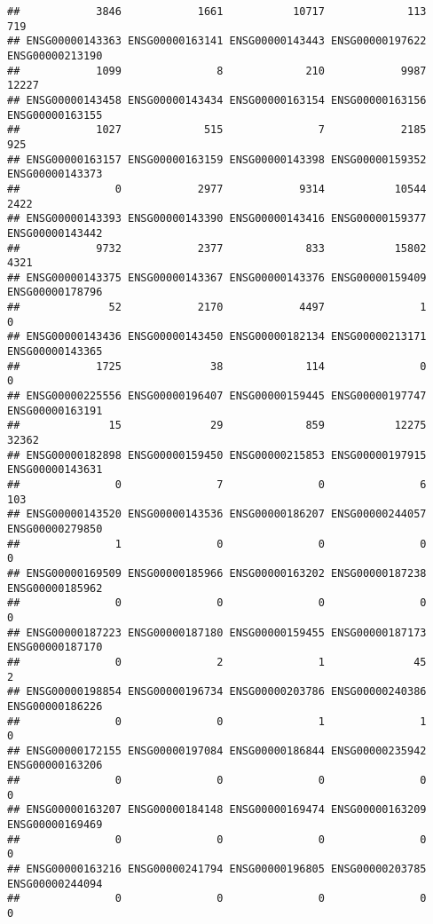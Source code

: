 \documentclass[
]{article}
\begin{document}
\begin{verbatim}
##            3846            1661           10717             113             719 
## ENSG00000143363 ENSG00000163141 ENSG00000143443 ENSG00000197622 ENSG00000213190 
##            1099               8             210            9987           12227 
## ENSG00000143458 ENSG00000143434 ENSG00000163154 ENSG00000163156 ENSG00000163155 
##            1027             515               7            2185             925 
## ENSG00000163157 ENSG00000163159 ENSG00000143398 ENSG00000159352 ENSG00000143373 
##               0            2977            9314           10544            2422 
## ENSG00000143393 ENSG00000143390 ENSG00000143416 ENSG00000159377 ENSG00000143442 
##            9732            2377             833           15802            4321 
## ENSG00000143375 ENSG00000143367 ENSG00000143376 ENSG00000159409 ENSG00000178796 
##              52            2170            4497               1               0 
## ENSG00000143436 ENSG00000143450 ENSG00000182134 ENSG00000213171 ENSG00000143365 
##            1725              38             114               0               0 
## ENSG00000225556 ENSG00000196407 ENSG00000159445 ENSG00000197747 ENSG00000163191 
##              15              29             859           12275           32362 
## ENSG00000182898 ENSG00000159450 ENSG00000215853 ENSG00000197915 ENSG00000143631 
##               0               7               0               6             103 
## ENSG00000143520 ENSG00000143536 ENSG00000186207 ENSG00000244057 ENSG00000279850 
##               1               0               0               0               0 
## ENSG00000169509 ENSG00000185966 ENSG00000163202 ENSG00000187238 ENSG00000185962 
##               0               0               0               0               0 
## ENSG00000187223 ENSG00000187180 ENSG00000159455 ENSG00000187173 ENSG00000187170 
##               0               2               1              45               2 
## ENSG00000198854 ENSG00000196734 ENSG00000203786 ENSG00000240386 ENSG00000186226 
##               0               0               1               1               0 
## ENSG00000172155 ENSG00000197084 ENSG00000186844 ENSG00000235942 ENSG00000163206 
##               0               0               0               0               0 
## ENSG00000163207 ENSG00000184148 ENSG00000169474 ENSG00000163209 ENSG00000169469 
##               0               0               0               0               0 
## ENSG00000163216 ENSG00000241794 ENSG00000196805 ENSG00000203785 ENSG00000244094 
##               0               0               0               0               0 

\end{verbatim}
\end{document}
